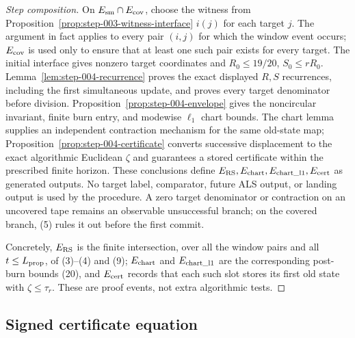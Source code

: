 \begin{proof}[Step composition]
On \(E_{\rm sm}\cap E_{\rm cov}\), choose the witness from Proposition~\ref{prop:step-003-witness-interface} \(i(j)\) for
each target \(j\). The argument in fact applies to every pair \((i,j)\) for
which the window event occurs; \(E_{\rm cov}\) is used only to
ensure that at least one such pair exists for every target. The initial interface gives nonzero target
coordinates and \(R_0\le19/20\), \(S_0\le rR_0\). Lemma~\ref{lem:step-004-recurrence}
proves the exact displayed \(R,S\) recurrences, including the first
simultaneous update, and proves every target denominator before division.
Proposition~\ref{prop:step-004-envelope} gives the noncircular invariant,
finite burn entry, and modewise \(\ell_1\) chart bounds. The chart lemma
supplies an independent contraction mechanism for the same old-state map;
Proposition~\ref{prop:step-004-certificate} converts successive displacement
to the exact algorithmic Euclidean \(\zeta\) and guarantees a stored
certificate within the prescribed finite horizon. These conclusions define
\(E_{\rm RS},E_{\rm chart},E_{\rm chart\_l1},E_{\rm cert}\) as generated
outputs. No target label, comparator, future ALS output, or landing output is
used by the procedure. A zero target denominator or contraction on an
uncovered tape remains an observable unsuccessful branch; on the covered
branch, (5) rules it out before the first commit.

Concretely, \(E_{\rm RS}\) is the finite intersection, over all the window pairs and all \(t\le L_{\rm prop}\), of (3)--(4) and (9);
\(E_{\rm chart}\) and \(E_{\rm chart\_l1}\) are the corresponding post-burn
bounds (20), and \(E_{\rm cert}\) records that each such slot stores its
first old state with \(\zeta\le\tau_r\). These are proof events, not extra
algorithmic tests.
\end{proof}

\subsection{Signed certificate equation}\label{app:step-005}

